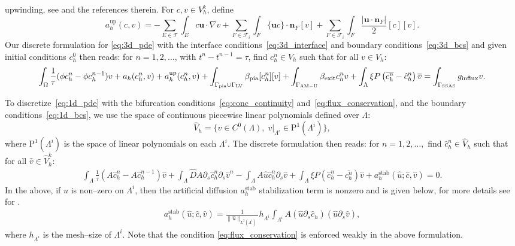 \documentclass[fleqn,10pt]{wlscirep}
\begin{document}
upwinding, see \cite[Section 2.3.1]{di2011mathematical} and the
references therein. For $c, v \in V_h^k$, define
\begin{equation}
  a_h^{\mathrm{up}}(c, v)
  = - \sum_{E \in \mathcal{T}} \int_E c\bm{u} \cdot \nabla v
  + \sum_{F \in \mathcal{F}_i } \int_F \{ \bm u  c\} \cdot \bm{n}_F [v] +
  \sum_{F \in \mathcal{F}_i} \int_F \frac{|\bm u \cdot \bm n_F|}{2} [c] [v] .
\end{equation}
Our discrete formulation for \eqref{eq:3d_pde} with the interface conditions~\eqref{eq:3d_interface} and boundary conditions~\eqref{eq:3d_bcs} and given initial conditions $c_h^0$ then reads: for $n = 1, 2, \dots$, with $t^n - t^{n-1} = \tau$, find $c_h^n \in V_h$ such that for all $v \in V_h$:
\begin{equation} \label{eq:3d_dg_disc}
  \int_{\Omega} \frac{1}{\tau} (\phi c_h^n - \phi c_h^{n-1}) v
  + a_h(c_h^n, v) + a_h^{\mathrm{up}}(c_h^n,v)
  + \int_{\Gamma_{\rm pia} \cup \Gamma_{\rm LV}} \beta_{\rm pia}[c_h^n][v] 
  + \int_{\Gamma_{\rm AM-U}} \beta_{\rm exit} c_h^n v 
  + \int_{\Lambda} \xi  P \left (\overline{c_h^n} - \hat c_h^n \right) \overline{v} 
  = 
  \int_{\Gamma_{\rm SSAS}} g_{\rm influx} v
  .
\end{equation}

To discretize~\eqref{eq:1d_pde} with the bifurcation
conditions~\eqref{eq:conc_continuity}
and~\eqref{eq:flux_conservation}, and the boundary
conditions~\eqref{eq:1d_bcs}, we use the space of continuous piecewise
linear polynomials defined over $\Lambda$:
\begin{equation}
  \hat V_h
  = \{ v \in C^0(\Lambda), \; v \vert_{\Lambda^i} \in \mathrm{P}^1(\Lambda^i) \}, 
\end{equation}
where $\mathrm{P}^1(\Lambda^i)$ is the space of linear polynomials on each $\Lambda^i$. The discrete formulation then reads: for $n = 1,2,\ldots, $ find $\hat c_h^n \in \hat V_h$ such that for all $\hat v \in \hat V_h^k$: 
\begin{align}\label{eq:1d_dg_disc}
\int_{\Lambda}  \frac{1}{\tau}(A  \hat c_h^n - A \hat c_h^{n-1}) \hat v  + \int_{\Lambda} \hat D A \partial_s \hat c_h^n  \partial_s \hat v^n - \int_{\Lambda} A \hat u \hat c_h^n \partial_s \hat v   +  \int_{\Lambda} \xi P (\hat c_h^n - \overline{c_h^n}) \hat v +a_h^{\mathrm{stab}}(\hat u; \hat c, \hat v) = 0.  
\end{align}
 In the above, if $\hat u$ is non--zero on $\Lambda^i$, then the artificial diffusion $a_h^{\mathrm{stab}}$ stabilization term is nonzero  and is given below, for more details see for  \cite[Section 12.6]{quarteroni2009numerical}. 
 \begin{align}
    a_h^{\mathrm{stab}}(\hat u; \hat c, \hat v) =  \frac{1}{\|\hat u\|_{L^2(\Lambda^i)}} 
 h_{\Lambda^i} \int_{\Lambda^i} A (\hat u \partial_s \hat c_h  ) (\hat u \partial_s \hat v),  
 \end{align}
 where $h_{\Lambda^i}$ is the mesh--size of $\Lambda^i$.
Note that the condition \eqref{eq:flux_conservation} is enforced weakly in the above formulation.
\end{document}
